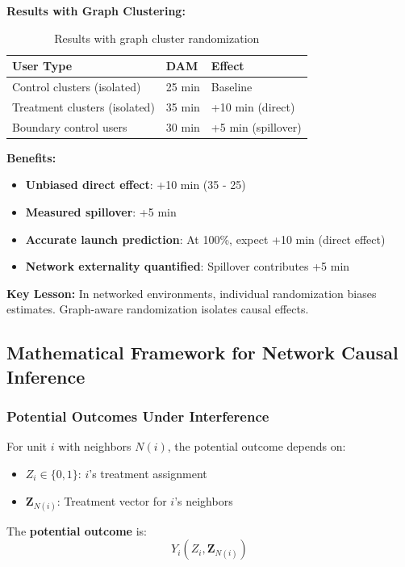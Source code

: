 \textbf{Results with Graph Clustering:}
\begin{table}[h]
\centering
\begin{tabular}{lll}
\toprule
\textbf{User Type} & \textbf{DAM} & \textbf{Effect} \\
\midrule
Control clusters (isolated) & 25 min & Baseline \\
Treatment clusters (isolated) & 35 min & +10 min (direct) \\
Boundary control users & 30 min & +5 min (spillover) \\
\bottomrule
\end{tabular}
\caption{Results with graph cluster randomization}
\end{table}

\textbf{Benefits:}
\begin{itemize}
    \item \textbf{Unbiased direct effect}: +10 min (35 - 25)
    \item \textbf{Measured spillover}: +5 min
    \item \textbf{Accurate launch prediction}: At 100\%, expect +10 min (direct effect)
    \item \textbf{Network externality quantified}: Spillover contributes +5 min
\end{itemize}

\textbf{Key Lesson:} In networked environments, individual randomization biases estimates. Graph-aware randomization isolates causal effects.

\subsection{Mathematical Framework for Network Causal Inference}

\subsubsection{Potential Outcomes Under Interference}

For unit $i$ with neighbors $N(i)$, the potential outcome depends on:
\begin{itemize}
    \item $Z_i \in \{0, 1\}$: $i$'s treatment assignment
    \item $\mathbf{Z}_{N(i)}$: Treatment vector for $i$'s neighbors
\end{itemize}

The \textbf{potential outcome} is:
\begin{equation}
Y_i(Z_i, \mathbf{Z}_{N(i)})
\end{equation}

